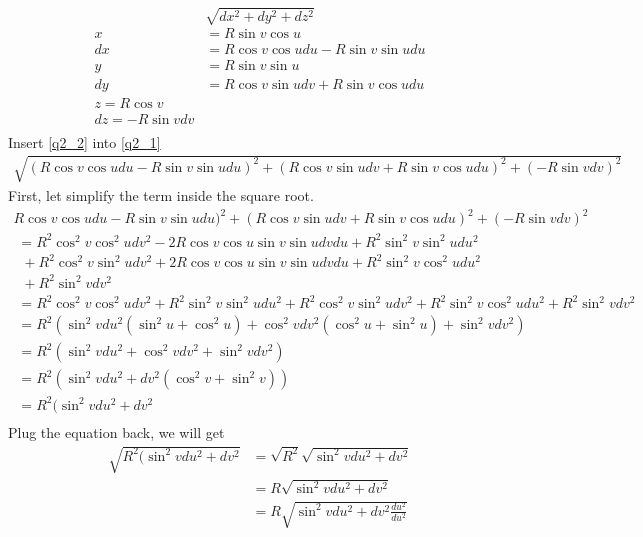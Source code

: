 \begin{equation}\label{q2_1}
\sqrt{dx^2 + dy^2 + dz^2}
\end{equation}
\begin{equation}\label{q2_2}
\begin{aligned}
x &= R \sin v \cos u\\
dx &= R \cos v \cos u du - R \sin v \sin u du\\
y &= R \sin v \sin u\\
dy &= R \cos v \sin u dv + R \sin v \cos u du\\
z = R \cos v\\
dz = -R \sin v dv\\
\end{aligned}
\end{equation}
Insert \ref{q2_2} into \ref{q2_1}
\begin{equation}
\begin{aligned}
\sqrt{(R \cos v \cos u du - R \sin v \sin u du)^2 + (R \cos v \sin u dv + R \sin v \cos u du)^2 + (-R \sin v dv)^2}
\end{aligned}
\end{equation}
First, let simplify the term inside the square root.
\begin{equation}
\begin{aligned}
R \cos v \cos u du - R \sin v \sin u du)^2 + (R \cos v \sin u dv + R \sin v \cos u du)^2 + (-R \sin v dv)^2\\
\;= R^2 \cos^2 v \cos^2 u dv^2 - 2 R \cos v \cos u \sin v \sin u dv du + R^2 \sin^2 v \sin^2 u du^2 \\
\;\;+ R^2 \cos^2 v \sin^2 u dv^2 + 2 R \cos v \cos u \sin v \sin u dv du + R^2 \sin^2 v \cos^2 u du^2 \\
\;\;+ R^2 \sin^2 v dv^2\\
\;= R^2 \cos^2 v \cos^2 u dv^2 + R^2 \sin^2 v \sin^2 u du^2 + R^2 \cos^2 v \sin^2 u dv^2 + R^2 \sin^2 v \cos^2 u du^2 + R^2 \sin^2 v dv^2\\
\;= R^2 (\sin^2 v du^2 (\sin^2 u + \cos^2 u) + \cos^2 v dv^2(\cos^2 u + \sin^2 u) + \sin^2 v dv^2)\\
\;= R^2 (\sin^2 v du^2 + \cos^2 v dv^2 + \sin^2 v dv^2)\\
\;= R^2 (\sin^2 v du^2 + dv^2(\cos^2 v + \sin^2 v))\\
\;= R^2 (\sin^2 v du^2 + dv^2\\
\end{aligned}
\end{equation}
Plug the equation back, we will get
\begin{equation}
\begin{aligned}
\sqrt{R^2 (\sin^2 v du^2 + dv^2} &= \sqrt{R^2} \sqrt{\sin^2 v du^2 + dv^2}\\
&= R \sqrt{\sin^2 v du^2 + dv^2}\\
&= R \sqrt{\sin^2 v du^2 + dv^2 \frac{du^2}{du^2}}\\
\end{aligned}
\end{equation}
